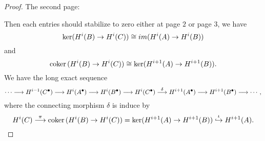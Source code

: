 \begin{proof}
The second page:
\begin{center}
\end{center}
Then each entries should stabilize to zero either at page $2$ or page $3$, we have
$$
\ker(H^{i}(B)\rightarrow H^{i}(C))\cong im(H^{i}(A)\rightarrow H^{i}(B))
$$
and
$$
\text{coker\,}(H^{i}(B)\rightarrow H^{i}(C))\cong \ker (H^{i+1}(A)\rightarrow H^{i+1}(B)).
$$
We have the long exact sequence
$$
\cdots\longrightarrow H^{i-1}(C^{\bullet})\longrightarrow H^{i}(A^\bullet)\longrightarrow H^{i}(B^\bullet)\longrightarrow  H^{i}(C^\bullet)\overset{\delta}{\longrightarrow} H^{i+1}(A^\bullet)\longrightarrow H^{i+1}(B^\bullet)\longrightarrow \cdots,
$$
where the connecting morphism $\delta$ is induce by 
$$
H^{i}(C)\overset{\pi}{\longrightarrow}
\text{coker\,}(H^{i}(B)\rightarrow H^{i}(C))= \ker (H^{i+1}(A)\rightarrow H^{i+1}(B))\overset{\iota}{\hookrightarrow} H^{i+1}(A).
$$

\end{proof}
